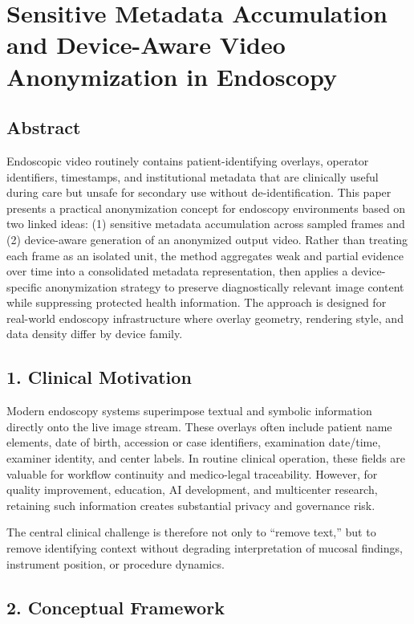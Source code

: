 \section*{Sensitive Metadata Accumulation and Device-Aware Video Anonymization in Endoscopy}

\subsection*{Abstract}
Endoscopic video routinely contains patient-identifying overlays, operator
identifiers, timestamps, and institutional metadata that are clinically useful
during care but unsafe for secondary use without de-identification. This paper
presents a practical anonymization concept for endoscopy environments based on
two linked ideas: (1) sensitive metadata accumulation across sampled frames and
(2) device-aware generation of an anonymized output video. Rather than treating
each frame as an isolated unit, the method aggregates weak and partial evidence
over time into a consolidated metadata representation, then applies a
device-specific anonymization strategy to preserve diagnostically relevant image
content while suppressing protected health information. The approach is designed
for real-world endoscopy infrastructure where overlay geometry, rendering style,
and data density differ by device family.

\subsection*{1. Clinical Motivation}
Modern endoscopy systems superimpose textual and symbolic information directly
onto the live image stream. These overlays often include patient name elements,
date of birth, accession or case identifiers, examination date/time, examiner
identity, and center labels. In routine clinical operation, these fields are
valuable for workflow continuity and medico-legal traceability. However, for
quality improvement, education, AI development, and multicenter research,
retaining such information creates substantial privacy and governance risk.

The central clinical challenge is therefore not only to ``remove text,'' but to
remove identifying context without degrading interpretation of mucosal findings,
instrument position, or procedure dynamics.

\subsection*{2. Conceptual Framework}

